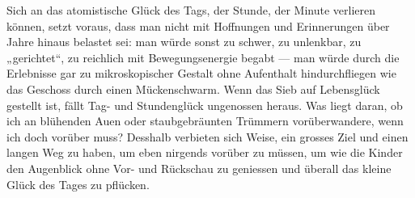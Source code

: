 Sich an das atomistische Glück des Tags, der Stunde, der Minute verlieren können, setzt voraus, dass man nicht mit Hoffnungen und Erinnerungen über Jahre hinaus belastet sei: man würde sonst zu schwer, zu unlenkbar, zu „gerichtet“, zu reichlich mit Bewegungsenergie begabt — man würde durch die Erlebnisse gar zu mikroskopischer Gestalt ohne Aufenthalt hindurchfliegen wie das Geschoss durch einen Mückenschwarm.  Wenn das Sieb auf Lebensglück gestellt ist, fällt Tag- und Stundenglück ungenossen heraus. Was liegt daran, ob ich an blühenden Auen oder staubgebräunten Trümmern vorüberwandere, wenn ich doch vorüber muss? Desshalb verbieten sich Weise, ein grosses Ziel und einen langen Weg zu haben, um eben nirgends vorüber zu müssen, um wie die Kinder den Augenblick ohne Vor- und Rückschau zu geniessen und überall das kleine Glück des Tages zu pflücken.
\par

